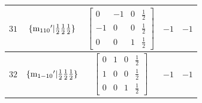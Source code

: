 \documentclass[fleqn,8pt]{jsarticle}
\begin{document}
\begin{longtable}{ccccc}
$ 31 $ & $ \{{\rm m}_{110}{}'|\frac{1}{2} \frac{1}{2} \frac{1}{2}\} $ & $ \begin{bmatrix} 0 & -1 & 0 & \frac{1}{2} \\ -1 & 0 & 0 & \frac{1}{2} \\ 0 & 0 & 1 & \frac{1}{2} \end{bmatrix} $ & $ -1 $ & $ -1 $ \\ \hline
$ 32 $ & $ \{{\rm m}_{1-10}{}'|\frac{1}{2} \frac{1}{2} \frac{1}{2}\} $ & $ \begin{bmatrix} 0 & 1 & 0 & \frac{1}{2} \\ 1 & 0 & 0 & \frac{1}{2} \\ 0 & 0 & 1 & \frac{1}{2} \end{bmatrix} $ & $ -1 $ & $ -1 $ \\
\end{longtable}
\end{document}
